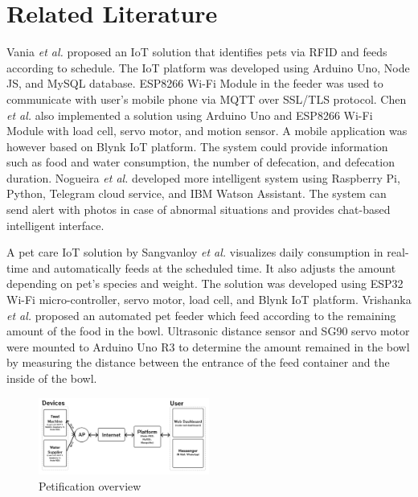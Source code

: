 \documentclass[conference]{IEEEtran}
\begin{document}
\section{Related Literature}
Vania \textit{et al.} \cite{b11} proposed an IoT solution that identifies pets via RFID and feeds according to schedule.
The IoT platform was developed using Arduino Uno, Node JS, and MySQL database. ESP8266 Wi-Fi Module in the feeder was used to communicate with user’s mobile phone via MQTT over SSL/TLS protocol.
Chen \textit{et al.} \cite{b4} also implemented a solution using Arduino Uno and ESP8266 Wi-Fi Module with load cell, servo motor, and motion sensor. A mobile application was however based on Blynk IoT platform. The system could
provide information such as food and water consumption, the number of defecation, and defecation duration.
Nogueira \textit{et al.} \cite{b10} developed  more intelligent system using Raspberry Pi, Python, Telegram cloud service, and IBM Watson Assistant. The system can send alert with photos in case of abnormal situations and provides chat-based intelligent interface.   

A pet care IoT solution by Sangvanloy \textit{et al.} \cite{b3} visualizes daily consumption in real-time and automatically feeds at the scheduled time. It also adjusts the amount depending on pet’s species and weight.
The solution was developed using ESP32 Wi-Fi micro-controller, servo motor, load cell, and  Blynk IoT platform.
Vrishanka \textit{et al.} \cite{b9} proposed an automated pet feeder which feed according to the remaining amount of the food in the bowl.
Ultrasonic distance sensor and SG90 servo motor were mounted to Arduino Uno R3 to determine the amount remained in the bowl by measuring the distance between the entrance of the feed container and the inside of the bowl.

\begin{figure}[htbp]
\centerline{\includegraphics[width=0.5\textwidth]{./images/Overview.png}}
\caption{Petification overview}
\label{fig1}
\end{figure}
\end{document}
